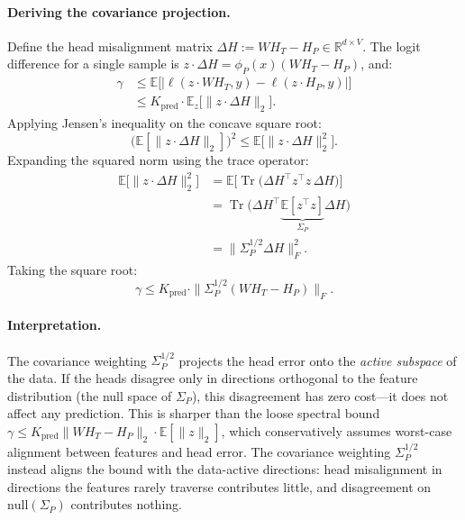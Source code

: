 \paragraph{Deriving the covariance projection.}
Define the head misalignment matrix $\Delta H := W H_T - H_P \in \mathbb{R}^{d \times V}$. The logit difference for a single sample is $z \cdot \Delta H = \phi_P(x)(W H_T - H_P)$, and:
\begin{equation}
\begin{aligned}
\gamma &\le \mathbb{E}\!\big[|\ell(z \cdot W H_T, y) - \ell(z \cdot H_P, y)|\big] \\
&\le K_{\mathrm{pred}} \cdot \mathbb{E}_z\!\big[\|z \cdot \Delta H\|_2\big].
\end{aligned}
\end{equation}
Applying Jensen's inequality on the concave square root:
\begin{equation}
\big(\mathbb{E}[\|z \cdot \Delta H\|_2]\big)^2 \le \mathbb{E}\!\big[\|z \cdot \Delta H\|_2^2\big].
\end{equation}
Expanding the squared norm using the trace operator:
\begin{equation}
\begin{aligned}
\mathbb{E}\!\big[\|z \cdot \Delta H\|_2^2\big] &= \mathbb{E}\!\Big[\operatorname{Tr}\!\big(\Delta H^\top z^\top z\, \Delta H\big)\Big] \\
&= \operatorname{Tr}\!\Big(\Delta H^\top \underbrace{\mathbb{E}[z^\top z]}_{\Sigma_P} \Delta H\Big) \\
&= \|\Sigma_P^{1/2} \Delta H\|_F^2.
\end{aligned}
\end{equation}
Taking the square root:
\begin{equation}
\label{eq:gamma_final}
\gamma \le K_{\mathrm{pred}} \cdot \|\Sigma_P^{1/2}(W H_T - H_P)\|_F.
\end{equation}

\paragraph{Interpretation.} The covariance weighting $\Sigma_P^{1/2}$ projects the head error onto the \emph{active subspace} of the data. If the heads disagree only in directions orthogonal to the feature distribution (the null space of $\Sigma_P$), this disagreement has zero cost---it does not affect any prediction. This is sharper than the loose spectral bound $\gamma \le K_{\mathrm{pred}} \|W H_T - H_P\|_2 \cdot \mathbb{E}[\|z\|_2]$, which conservatively assumes worst-case alignment between features and head error. The covariance weighting $\Sigma_P^{1/2}$ instead aligns the bound with the data-active directions: head misalignment in directions the features rarely traverse contributes little, and disagreement on $\mathrm{null}(\Sigma_P)$ contributes nothing.


